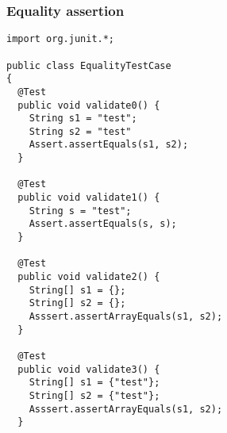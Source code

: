 \begin{frame}[fragile, hasprev=false, hasnext=false]
\frametitle{Equality assertion}
\label{example:junit-equality-assertion}

\begin{lstlisting}
import org.junit.*;

public class EqualityTestCase
{
  @Test
  public void validate0() {
    String s1 = "test";
    String s2 = "test"
    Assert.assertEquals(s1, s2);
  }

  @Test
  public void validate1() {
    String s = "test";
    Assert.assertEquals(s, s);
  }

  @Test
  public void validate2() {
    String[] s1 = {};
    String[] s2 = {};
    Asssert.assertArrayEquals(s1, s2);
  }

  @Test
  public void validate3() {
    String[] s1 = {"test"};
    String[] s2 = {"test"};
    Asssert.assertArrayEquals(s1, s2);
  }
\end{lstlisting}
\end{frame}